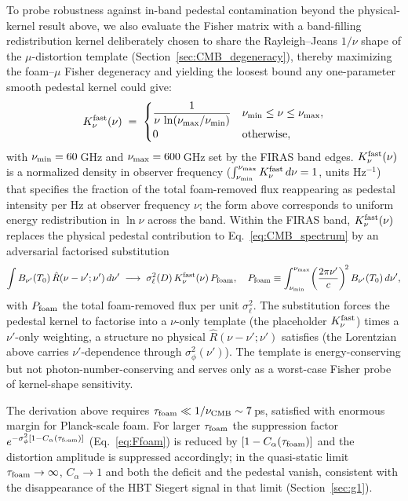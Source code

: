 \documentclass[aps,prd,onecolumn,amsmath,amssymb]{revtex4-2}
\begin{document}
To probe robustness against in-band pedestal contamination beyond
the physical-kernel result above, we also evaluate the Fisher matrix
with a band-filling redistribution kernel deliberately chosen to
share the Rayleigh--Jeans $1/\nu$ shape of the $\mu$-distortion
template (Section~\ref{sec:CMB_degeneracy}), thereby maximizing the
foam--$\mu$ Fisher degeneracy and yielding the loosest bound any
one-parameter smooth pedestal kernel could give:
\begin{equation}
  K_\nu^{\rm fast}(\nu) \;=\;
  \begin{cases}
    \dfrac{1}{\nu\,\ln(\nu_{\rm max}/\nu_{\rm min})} &
    \nu_{\rm min}\le\nu\le\nu_{\rm max},\\[4pt]
    0 & \text{otherwise},
  \end{cases}
  \label{eq:Knufast}
\end{equation}
with $\nu_{\rm min}=60$\,GHz and $\nu_{\rm max}=600$\,GHz set by the
FIRAS band edges.  $K_\nu^{\rm fast}(\nu)$ is a normalized density
in observer frequency ($\int_{\nu_{\rm min}}^{\nu_{\rm max}}
K_\nu^{\rm fast}\,d\nu=1$, units Hz$^{-1}$) that specifies the
fraction of the total foam-removed flux reappearing as pedestal
intensity per Hz at observer frequency $\nu$; the form above
corresponds to uniform energy redistribution in $\ln\nu$ across the
band.  Within the FIRAS band, $K_\nu^{\rm fast}(\nu)$ replaces the
physical pedestal contribution to Eq.~\eqref{eq:CMB_spectrum} by an
adversarial factorised substitution
\begin{equation}
  \int B_{\nu'}(T_0)\,\hat{R}(\nu-\nu';\nu')\,d\nu'
    \;\longrightarrow\;
    \sigma_\ell^2(D)\,K_\nu^{\rm fast}(\nu)\,P_{\rm foam},
  \quad
  P_{\rm foam} \equiv \int_{\nu_{\rm min}}^{\nu_{\rm max}}
    \!\left(\frac{2\pi\nu'}{c}\right)^{\!2} B_{\nu'}(T_0)\,d\nu',
  \label{eq:Kfast_pedestal}
\end{equation}
with $P_{\rm foam}$ the total foam-removed flux per unit
$\sigma_\ell^2$.  The substitution forces the pedestal kernel to
factorise into a $\nu$-only template (the placeholder
$K_\nu^{\rm fast}$) times a $\nu'$-only weighting, a structure no
physical $\hat{R}(\nu-\nu';\nu')$ satisfies (the Lorentzian above
carries $\nu'$-dependence through $\sigma_\phi^2(\nu')$).  The
template is energy-conserving but not photon-number-conserving and
serves only as a worst-case Fisher probe of kernel-shape
sensitivity.

The derivation above requires $\tau_{\rm foam}\ll 1/\nu_{\rm CMB}\sim
7$\,ps, satisfied with enormous margin for Planck-scale foam.  For
larger $\tau_{\rm foam}$ the suppression factor
$e^{-\sigma_\phi^2[1-C_\alpha(\tau_{\rm foam})]}$
(Eq.~\eqref{eq:Ffoam}) is reduced by $[1-C_\alpha(\tau_{\rm foam})]$
and the distortion amplitude is suppressed accordingly; in the
quasi-static limit $\tau_{\rm foam}\to\infty$, $C_\alpha\to 1$ and
both the deficit and the pedestal vanish, consistent with the
disappearance of the HBT Siegert signal in that limit
(Section~\ref{sec:g1}).
\end{document}
